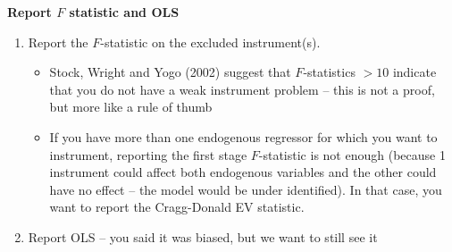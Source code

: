 \documentclass[notes=show]{beamer}
\begin{document}
\begin{frame}[plain]
\begin{center}
\textbf{Report $F$ statistic and OLS}
\end{center}

	\begin{enumerate}\addtocounter{enumi}{2}
	\item Report the $F$-statistic on the excluded instrument(s).
		\begin{itemize}
		\item Stock, Wright and Yogo (2002) suggest that $F$-statistics $>10$ indicate that you do not have a weak instrument problem -- this is not a proof, but more like a rule of thumb
		\item If you have more than one endogenous regressor for which you want to instrument, reporting the first stage $F$-statistic is not enough (because 1 instrument could affect both endogenous variables and the other could have no effect -- the model would be under identified). In that case, you want to report the Cragg-Donald EV statistic.
		\end{itemize}
	\item Report OLS -- you said it was biased, but we want to still see it
	\end{enumerate}

\end{frame}
\end{document}

